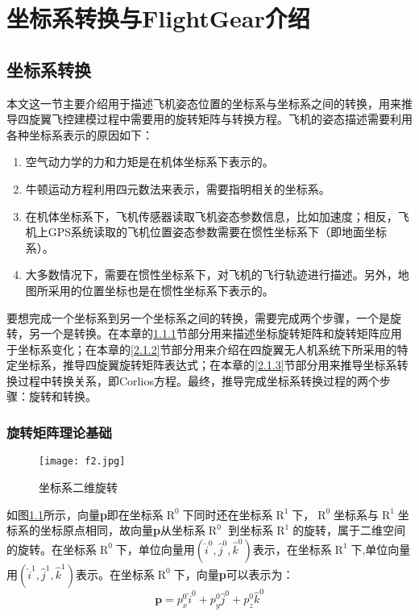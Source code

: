 
\chapter{坐标系转换与FlightGear介绍}\label{introduction}

\section{坐标系转换}
本文这一节主要介绍用于描述飞机姿态位置的坐标系与坐标系之间的转换，用来推导四旋翼飞控建模过程中需要用的旋转矩阵与转换方程。飞机的姿态描述需要利用各种坐标系表示的原因如下：
%
\begin{enumerate}
	\item 空气动力学的力和力矩是在机体坐标系下表示的。
	\item 牛顿运动方程利用四元数法来表示，需要指明相关的坐标系。
	\item 在机体坐标系下，飞机传感器读取飞机姿态参数信息，比如加速度；相反，飞机上GPS系统读取的飞机位置姿态参数需要在惯性坐标系下（即地面坐标系）。
	\item 大多数情况下，需要在惯性坐标系下，对飞机的飞行轨迹进行描述。另外，地图所采用的位置坐标也是在惯性坐标系下表示的。
\end{enumerate}

要想完成一个坐标系到另一个坐标系之间的转换，需要完成两个步骤，一个是旋转，另一个是转换。在本章的\ref{2.1.1}节部分用来描述坐标旋转矩阵和旋转矩阵应用于坐标系变化；在本章的\ref{2.1.2}节部分用来介绍在四旋翼无人机系统下所采用的特定坐标系，推导四旋翼旋转矩阵表达式；在本章的\ref{2.1.3}节部分用来推导坐标系转换过程中转换关系，即Corlios方程。最终，推导完成坐标系转换过程的两个步骤：旋转和转换。


\subsection{旋转矩阵理论基础} \label{2.1.1}

\begin{figure}[!ht]
\centering
\texttt{[image: f2.jpg]}
\caption{坐标系二维旋转} 
\label{fig2}
\end{figure}

如图\ref{fig2}所示，向量{\bf{p}}即在坐标系$\mathop R\nolimits^0$下同时还在坐标系$\mathop R\nolimits^1$下，$\mathop R\nolimits^0$坐标系与$\mathop R\nolimits^1$坐标系的坐标原点相同，故向量{\bf{p}}从坐标系$\mathop R\nolimits^0$ 到坐标系$\mathop R\nolimits^1 $的旋转，属于二维空间的旋转。在坐标系$\mathop R\nolimits^0$下，单位向量用$\left( {{{\hat i}^0},{{\hat j}^0},{{\hat k}^0}} \right)$表示，在坐标系$\mathop R\nolimits^1 $下,单位向量用$\left( {{{\hat i}^1},{{\hat j}^1},{{\hat k}^1}} \right)$表示。在坐标系$\mathop R\nolimits^0$下，向量{\bf{p}}可以表示为：
%
\begin{equation}
\mathbf{p} = p_{x}^{0} \hat{i}^0 + p_{y}^{0} \hat{j}^0 + p_{z}^{0} \hat{k}^0
\end{equation}

